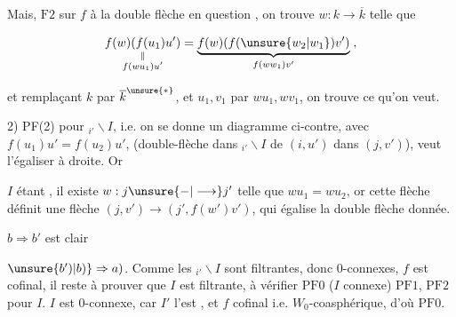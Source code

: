 

Mais,  $\mathrm{F}2$ sur $f$ à la double flèche en question , on trouve $w:k\longrightarrow\overline{k}$ telle que

\[
\underset{\substack{\Vert\\ f(wu_1)u'}}{f(w)(f(u_1)u')}=
\underset{f(ww_1)v'}{\underbrace{f(w)(f(\unsure{w_2|w_1})v')}}\;,
\]

et remplaçant $k$ par $\overline{k}^{\unsure{*}}$, et $u_1,v_1$ par $wu_1,wv_1$, on trouve ce qu'on veut.

2) PF(2) pour $ {}_{i'}\backslash I$, i.e. on se donne un diagramme ci-contre, avec $f(u_1)u'=f(u_2)u'$, \deleted{\unsure{\(\xi\)}}  (double-flèche dans $ {}_{i'}\backslash I$ de $(i,u')$ dans $(j,v')$),  veut l'égaliser à droite. Or


$I$ étant , il existe $w:j\unsure{\mathbin{-}|\longrightarrow}j'$ telle que $wu_1=wu_2$, or cette flèche définit  une flèche $(j,v')\longrightarrow(j',f(w')v')$, qui égalise la double flèche donnée.

$b\Rightarrow b'$ est clair

$\unsure{b')|b)}\Rightarrow a)$. Comme les $ {}_{i'}\backslash I$ sont filtrantes, donc $0$-connexes, $f$ est cofinal, il reste à prouver que $I$ est filtrante,  à vérifier  $\mathrm{PF}0$ ($I$ connexe) $\mathrm{PF}1$, $\mathrm{PF}2$ pour $I$. $I$ est $0$-connexe, car $I'$ l'est , et $f$ cofinal i.e. $W_0$-coasphérique, d'où $\mathrm{PF}0$.

